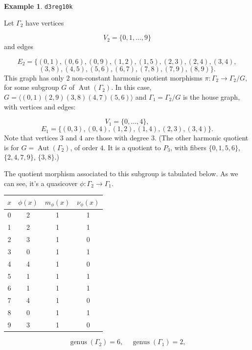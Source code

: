 \documentclass[12pt,letterpaper]{article}
\theoremstyle{definition}
\newtheorem{example}[theorem]{Example}
\DeclareMathOperator{\Aut}{Aut}
\DeclareMathOperator{\genus}{genus}
\begin{document}
\begin{example}%
\label{example:d3reg10k}
  {\tt d3reg10k}\newline
{\rm  
Let $\Gamma_2$ have vertices

\[
V_2=\{0,1,\dots,9\}
\]
and edges

\[
E_2 = \{
(0, 1), (0, 6), (0, 9), (1, 2), (1, 5), (2, 3), (2, 4), (3, 4),
\]
\[
(3, 8), (4, 5), (5, 6), (6, 7), (7, 8), (7, 9), (8, 9)
\}.
\]
This graph has only $2$ non-constant harmonic quotient
morphisms $\pi: \Gamma_2\to \Gamma_2/G$, for some subgroup
$G$ of $\Aut(\Gamma_2)$. In this case,
$G = \langle (0,1)(2,9)(3,8)(4,7)(5,6) \rangle$ and
$\Gamma_1 =  \Gamma_2/G$ is the house graph, with vertices and edges:

\[
V_1 = \{0, \dots, 4\},
\]
\[
E_1 = \{(0, 3), (0, 4), (1, 2), (1, 4), (2, 3), (3, 4)\}.
\]
Note that vertices $3$ and $4$ are those with degree $3$.
(The other harmonic quotient is for $G=\Aut(\Gamma_2)$, of order $4$. It is a
quotient to $P_3$, with fibers $\{0,1,5,6\}$, $\{2,4,7,9\}$, $\{3,8\}$.)

The quotient morphism 
associated to this subgroup
is tabulated below. As we can see, it's a quasicover
$\phi:\Gamma_2\to \Gamma_1$.

\begin{center}
\begin{tabular}{c|c|c|c}  
  $x$ & $\phi(x)$ & $m_\phi(x)$ & $\nu_\phi(x)$ \\ \hline
  0   &    2   &        1         &  1   \\ 
  1   &    2   &        1         &  1   \\ 
  2   &    3   &        1         &  0   \\ 
  3   &    0   &        1         &  1   \\ 
  4   &    4   &        1         &  0   \\ 
  5   &    1   &        1         &  1    \\ 
  6   &    1   &        1         &  1   \\ 
  7   &    4   &        1         &  0   \\
  8   &    0   &        1         &  1   \\
  9   &    3   &        1         &  0   \\ 
\end{tabular}
\end{center}

\[
  \genus(\Gamma_2) =6,\ \ \ \ \
  \genus(\Gamma_1) =2,
\]

}
\end{example}
\end{document}
